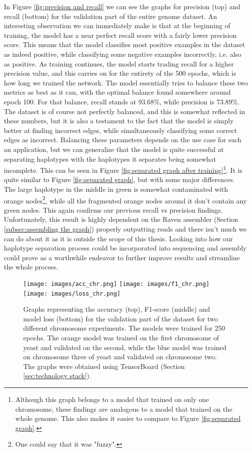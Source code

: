 \documentclass[times, utf8, diplomski, english]{fer_eng}
\begin{document}
In Figure \ref{fig:precision and recall} we can see the graphs for precision (top) and recall (bottom) for the validation part of the entire genome dataset. An interesting observation we can immediately make is that at the beginning of training, the model has a near perfect recall score with a fairly lower precision score. This means that the model classifies most positive examples in the dataset as indeed positive, while classifying some negative examples incorrectly, i.e. also as positive. As training continues, the model starts trading recall for a higher precision value, and this carries on for the entirety of the 500 epochs, which is how long we trained the network. The model essentially tries to balance these two metrics as best as it can, with the optimal balance found somewhere around epoch 100. For that balance, recall stands at 93.68\%, while precision is 73.89\%. The dataset is of course not perfectly balanced, and this is somewhat reflected in these numbers, but it is also a testament to the fact that the model is simply better at finding incorrect edges, while simultaneously classifying some correct edges as incorrect. Balancing these parameters depends on the use case for such an application, but we can generalize that the model is quite successful at separating haplotypes with the haplotypes it separates being somewhat incomplete. This can be seen in Figure \ref{fig:separated graph after training}\footnote{Although this graph belongs to a model that trained on only one chromosome, these findings are analogous to a model that trained on the whole genome. This also makes it easier to compare to Figure \ref{fig:separated graph}.}. It is quite similar to Figure \ref{fig:separated graph}, but with some major differences. The large haplotype in the middle in green is somewhat contaminated with orange nodes\footnote{One could say that it was "fuzzy".}, while all the fragmented orange nodes around it don't contain any green nodes. This again confirms our previous recall vs precision findings. Unfortunately, this result is highly dependent on the Raven assembler (Section \ref{subsec:assembling the graph}) properly outputting reads and there isn't much we can do about it as it is outside the scope of this thesis. Looking into how our haplotype separation process could be incorporated into sequencing and assembly could prove as a worthwhile endeavor to further improve results and streamline the whole process.

\begin{figure}
	\centering
	\texttt{[image: images/acc\_chr.png]}
	\texttt{[image: images/f1\_chr.png]}
	\texttt{[image: images/loss\_chr.png]}
	\caption[Accuracy,f1-score and loss graph for different chromosomes]{Graphs representing the accuracy (top), F1-score (middle) and model loss (bottom) for the validation part of the dataset for two different chromosome experiments. The models were trained for 250 epochs. The orange model was trained on the first chromosome of yeast and validated on the second, while the blue model was trained on chromosome three of yeast and validated on chromosome two. The graphs were obtained using TensorBoard (Section \ref{sec:technology stack}).}
	\label{fig:accuracy, f1 score and loss chr}
\end{figure}
\end{document}
